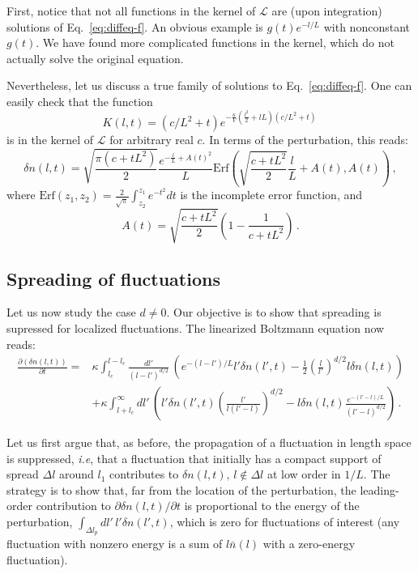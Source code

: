 \documentclass[a4paper,11pt]{article}
\newcommand{\lr}[1]{\left(#1\right)}
\begin{document}
First, notice that not all functions in the kernel of $\mathcal{L}$ are (upon integration) solutions of Eq.~\eqref{eq:diffeq-f}.
An obvious example is $g(t)e^{-l/L}$ with nonconstant $g(t)$.
We have found more complicated functions in the kernel, which do not actually solve the original equation.

Nevertheless, let us discuss a true family of solutions to Eq.~\eqref{eq:diffeq-f}.
One can easily check that the function
\begin{equation}
    K(l,t)=(c /L^2+t)e^{-\frac{\kappa}{V}\lr{\frac{l^2}{2}+lL}(c/L^2+t)}\, 
\end{equation}
is in the kernel of $\mathcal{L}$ for arbitrary real $c$.
In terms of the perturbation, this reads:
\begin{equation}\label{eq:analytic-fluctuation}
    \delta n(l,t)=\sqrt{\frac{\pi(c+t L^2)}{2}}\frac{e^{-\frac{l}{L}+A(t)^2}}{L}\text{Erf}\lr{\sqrt{\frac{c+t L^2}{2}}\frac{l}{L}+A(t),A(t)}\, ,
\end{equation}
where $\text{Erf}(z_1,z_2)=\frac{2}{\sqrt{\pi}}\int_{z_2}^{z_1}{e^{-t^2}dt}$ is the incomplete error function, and
\begin{equation}
    A(t)=\sqrt{\frac{c+t L^2}{2}}\lr{1-\frac{1}{c+tL^2}}\, .
\end{equation}

\subsection*{Spreading of fluctuations}
Let us now study the case $d\neq 0$.
Our objective is to show that spreading is supressed for localized fluctuations.
The linearized Boltzmann equation now reads:
\begin{equation}
    \begin{split}
     \frac{\partial \lr{\delta n(l,t)}}{\partial t}= & 
     \kappa\int_{l_c}^{l-l_c}{\frac{dl'}{\lr{l-l'}^{d/2}}\, \lr{e^{-(l-l')/L}l'\delta n(l',t)-\frac{1}{2}\lr{\frac{l}{l'}}^{d/2}l\delta n(l,t) }}
     \\ & 
     +\kappa \int_{l+l_c}^\infty{dl' \, \lr{ l'\delta n(l',t)\lr{\frac{l'}{l(l'-l)}}^{d/2}-l\delta n(l,t)\frac{e^{-(l'-l)/L}}{(l'-l)^{d/2}}}} \, .
\end{split}
\end{equation}

Let us first argue that, as before, the propagation of a fluctuation in length space is suppressed, \textit{i.e}, that a fluctuation that initially has a compact support of spread $\Delta l$ around $l_1$ contributes to $\delta n (l,t),\,  l\notin \Delta l$ at low order in $1/L$.
The strategy is to show that, far from the location of the perturbation, the leading-order contribution to $\partial \delta n(l,t)/\partial t$ is proportional to the energy of the perturbation, $\int_{\Delta l_p}{dl' \, l'\delta n(l',t)}$, which is zero for fluctuations of interest (any fluctuation with nonzero energy is a sum of $l\bar n(l)$ with a zero-energy fluctuation).
\end{document}
